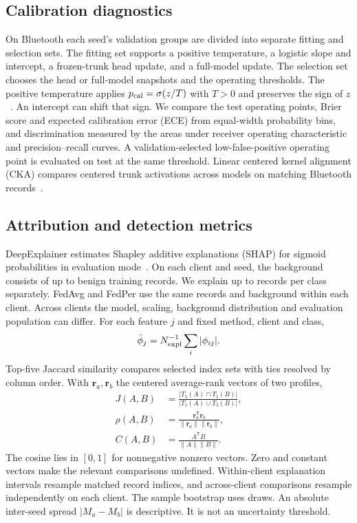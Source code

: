 \documentclass[nolineno]{ieeeaccess}
\begin{document}
\subsection{Calibration diagnostics}
On Bluetooth each seed's validation groups are divided into separate fitting and selection sets. The fitting set supports a positive temperature, a logistic slope and intercept, a frozen-trunk head update, and a full-model update. The selection set chooses the head or full-model snapshots and the operating thresholds. The positive temperature applies $p_{\rm cal}=\sigma(z/T)$ with $T>0$ and preserves the sign of $z$~\cite{guocalibration}. An intercept can shift that sign. We compare the test operating points, Brier score and expected calibration error (ECE) from equal-width probability bins, and discrimination measured by the areas under receiver operating characteristic and precision--recall curves. A validation-selected low-false-positive operating point is evaluated on test at the same threshold. Linear centered kernel alignment (CKA) compares centered trunk activations across models on matching Bluetooth records~\cite{kornblithcka}.

\subsection{Attribution and detection metrics}\label{sec:metrics}
DeepExplainer estimates Shapley additive explanations (SHAP) for sigmoid probabilities in evaluation mode~\cite{lundberg2017unified}. On each client and seed, the background consists of up to \RevisionBg{} benign training records. We explain up to \RevisionSample{} records per class separately. FedAvg and FedPer use the same records and background within each client. Across clients the model, scaling, background distribution and evaluation population can differ. For each feature $j$ and fixed method, client and class,
\begin{equation}
\bar{\phi}_j=N_{\rm expl}^{-1}\sum_i |\phi_{ij}|.
\end{equation}
Top-five Jaccard similarity compares selected index sets with ties resolved by column order. With $\mathbf r_a,\mathbf r_b$ the centered average-rank vectors of two profiles,
\begin{align}
J(A,B)&=\frac{|T_5(A)\cap T_5(B)|}{|T_5(A)\cup T_5(B)|},\\
\rho(A,B)&=\frac{\mathbf r_a^\mathsf{T}\mathbf r_b}{\|\mathbf r_a\|\|\mathbf r_b\|},\\
C(A,B)&=\frac{A^\mathsf{T}B}{\|A\|\|B\|}.
\end{align}
The cosine lies in $[0,1]$ for nonnegative nonzero vectors. Zero and constant vectors make the relevant comparisons undefined. Within-client explanation intervals resample matched record indices, and across-client comparisons resample independently on each client. The sample bootstrap uses \RevisionBootstrap{} draws. An absolute inter-seed spread $|M_a-M_b|$ is descriptive. It is not an uncertainty threshold.
\end{document}
